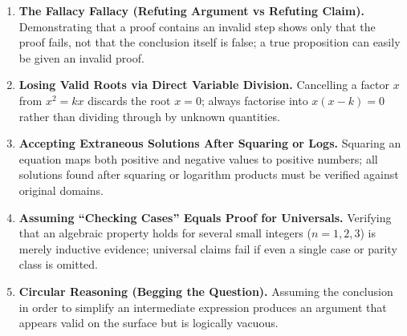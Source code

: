 \documentclass[11pt,a4paper]{article}
\begin{document}
\begin{enumerate}[leftmargin=2em, itemsep=4pt]
  \item \textbf{The Fallacy Fallacy (Refuting Argument vs Refuting Claim).}
        Demonstrating that a proof contains an invalid step shows only that the proof fails, not that the conclusion itself is false; a true proposition can easily be given an invalid proof. 
  \item \textbf{Losing Valid Roots via Direct Variable Division.}
        Cancelling a factor $x$ from $x^2=kx$ discards the root $x=0$; always factorise into $x(x-k)=0$ rather than dividing through by unknown quantities. 
  \item \textbf{Accepting Extraneous Solutions After Squaring or Logs.}
        Squaring an equation maps both positive and negative values to positive numbers; all solutions found after squaring or logarithm products must be verified against original domains. 
  \item \textbf{Assuming ``Checking Cases'' Equals Proof for Universals.}
        Verifying that an algebraic property holds for several small integers ($n=1,2,3$) is merely inductive evidence; universal claims fail if even a single case or parity class is omitted. 
  \item \textbf{Circular Reasoning (Begging the Question).}
        Assuming the conclusion in order to simplify an intermediate expression produces an argument that appears valid on the surface but is logically vacuous. 
\end{enumerate}

\end{document}
